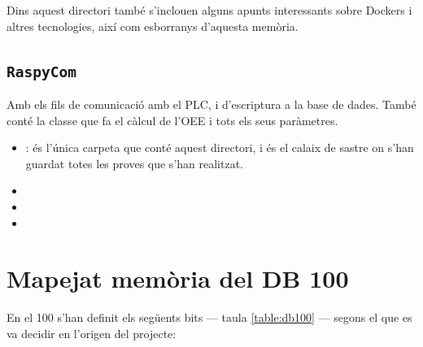 \documentclass{tfgitic}[2022/06/30]
\begin{document}
Dins aquest directori també s'inclouen alguns apunts interessants sobre Dockers i altres tecnologies, així com esborranys d'aquesta memòria.

\section{\texttt{RaspyCom}}
Amb els fils de comunicació amb el PLC, i d'escriptura a la base de dades. També conté la classe que fa el càlcul de l'OEE i tots els seus paràmetres.

\begin{itemize}
    \item {}: és l'única carpeta que conté aquest directori, i és el calaix de sastre on s'han guardat totes les proves que s'han realitzat.
    \item {}
    \item {}
    \item {}
\end{itemize}



\chapter{Mapejat memòria del DB 100}
\label{anex: db_100}
En el  100 s'han definit els següents bits --- taula \ref{table:db100} --- segons el que es va decidir en l'origen del projecte:
\end{document}
